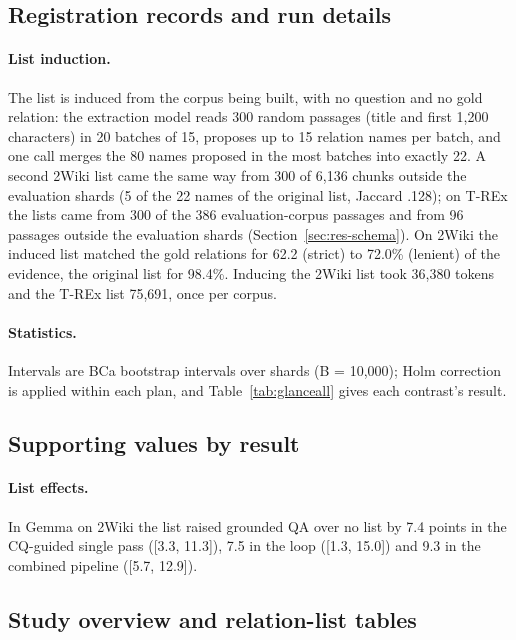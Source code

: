 \subsection{Registration records and run details}
\label{app:registration}
\paragraph{List induction.}\label{app:induction}
The list is induced from the corpus being built, with no question and no gold relation: the extraction model reads 300 random passages (title and first 1,200 characters) in 20 batches of 15, proposes up to 15 relation names per batch, and one call merges the 80 names proposed in the most batches into exactly 22. A second 2Wiki list came the same way from 300 of 6,136 chunks outside the evaluation shards (5 of the 22 names of the original list, Jaccard .128); on T-REx the lists came from 300 of the 386 evaluation-corpus passages and from 96 passages outside the evaluation shards (Section~\ref{sec:res-schema}). On 2Wiki the induced list matched the gold relations for 62.2 (strict) to 72.0\% (lenient) of the evidence, the original list for 98.4\%. Inducing the 2Wiki list took 36,380 tokens and the T-REx list 75,691, once per corpus.

\paragraph{Statistics.}
Intervals are BCa bootstrap intervals over shards (B = 10,000); Holm correction is applied within each plan, and Table~\ref{tab:glanceall} gives each contrast's result.

\endgroup


\subsection{Supporting values by result}
\label{app:addedvalues}
\paragraph{List effects.}
In Gemma on 2Wiki the list raised grounded QA over no list by 7.4 points in the CQ-guided single pass ([3.3, 11.3]), 7.5 in the loop ([1.3, 15.0]) and 9.3 in the combined pipeline ([5.7, 12.9]). 



\subsection{Study overview and relation-list tables}
\label{app:movedtables}

